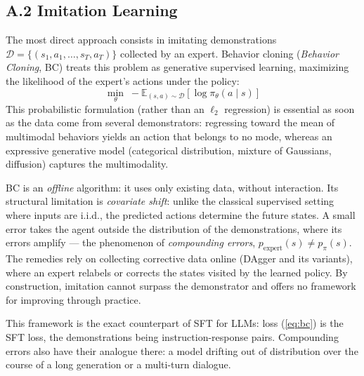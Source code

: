 \documentclass[11pt,a4paper]{article}
\begin{document}
\subsection*{A.2 Imitation Learning}
The most direct approach consists in imitating demonstrations $\mathcal{D} = \{(s_1, a_1, \dots, s_T, a_T)\}$ collected by an expert. Behavior cloning (\emph{Behavior Cloning}, BC) treats this problem as generative supervised learning, maximizing the likelihood of the expert's actions under the policy:
\begin{equation}
\min_\theta \; -\mathbb{E}_{(s,a) \sim \mathcal{D}} \left[ \log \pi_\theta(a \mid s) \right]
\label{eq:bc}
\end{equation}
This probabilistic formulation (rather than an $\ell_2$ regression) is essential as soon as the data come from several demonstrators: regressing toward the mean of multimodal behaviors yields an action that belongs to no mode, whereas an expressive generative model (categorical distribution, mixture of Gaussians, diffusion) captures the multimodality.

BC is an \emph{offline} algorithm: it uses only existing data, without interaction. Its structural limitation is \emph{covariate shift}: unlike the classical supervised setting where inputs are i.i.d., the predicted actions determine the future states. A small error takes the agent outside the distribution of the demonstrations, where its errors amplify — the phenomenon of \emph{compounding errors}, $p_{\text{expert}}(s) \neq p_\pi(s)$. The remedies rely on collecting corrective data online (DAgger and its variants), where an expert relabels or corrects the states visited by the learned policy. By construction, imitation cannot surpass the demonstrator and offers no framework for improving through practice.

This framework is the exact counterpart of SFT for LLMs: loss (\ref{eq:bc}) is the SFT loss, the demonstrations being instruction-response pairs. Compounding errors also have their analogue there: a model drifting out of distribution over the course of a long generation or a multi-turn dialogue.

\end{document}
